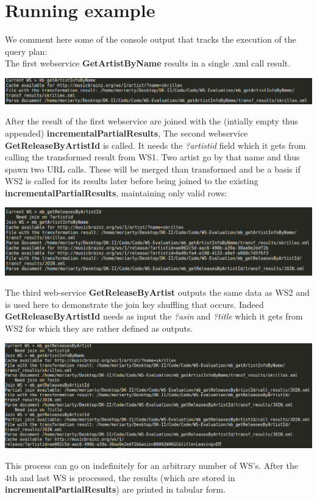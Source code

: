 \documentclass[11pt]{article}
\begin{document}
\section{Running example}
We comment here some of the console output that tracks the execution of the query plan:\\
The first webservice \textbf{GetArtistByName} results in a single .xml call result.
\begin{center}
\includegraphics[width=\linewidth]{ws1.png}
\end{center}
After the result of the first webservice are joined with the (intially empty thus appended) \textbf{incrementalPartialResults}, The second webservice \textbf{GetReleaseByArtistId} is called. It needs the \textit{?artistid} field which it gets from calling the transformed result from WS1. Two artist go by that name and thus spawn two URL calls. These will be merged than transformed and be a basis if WS2 is called for its results later before being joined to the existing \textbf{incrementalPartialResults}, maintaining only valid rows:
\begin{center}
\includegraphics[width=\linewidth]{ws2.png}
\end{center}
The third web-service \textbf{GetReleaseByArtist} outputs the same data as WS2 and is used here to demonstrate the join key shuffling that occurs. Indeed \textbf{GetReleaseByArtistId} needs as input the \textit{?asin} and \textit{?title} which it gets from WS2 for which they are rather defined as outputs.
\begin{center}
\includegraphics[width=\linewidth]{ws3.png}
\end{center}
This process can go on indefinitely for an arbitrary number of WS's. After the 4th and last WS is processed, the results (which are stored in \textbf{incrementalPartialResults}) are printed in tabular form.


\end{document}
